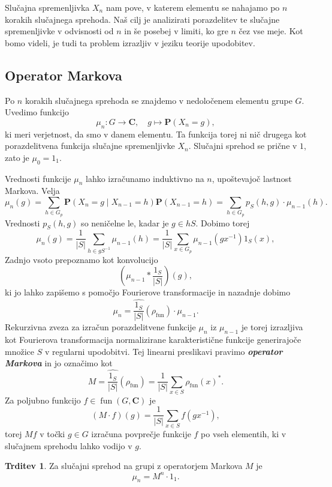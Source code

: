 \documentclass[11pt]{book}
\def\CC{\mathbf{C}}
\def\PP{\mathbf{P}}
\DeclareMathOperator\fun{fun}
\def\definicija{\color{rdeca}\bf\em}
\theoremstyle{definition}
\theoremstyle{zgled}
\theoremstyle{odprtproblem}
\theoremstyle{domacanaloga}
\theoremstyle{izrek}
\newtheorem*{trditev}{Trditev}
\begin{document}
Slučajna spremenljivka $X_n$ nam pove, v katerem elementu se nahajamo po $n$ korakih slučajnega sprehoda. Naš cilj je analizirati porazdelitev te slučajne spremenljivke v odvisnosti od $n$ in še posebej v limiti, ko gre $n$ čez vse meje. Kot bomo videli, je tudi ta problem izrazljiv v jeziku teorije upodobitev.

\subsection{Operator Markova}

Po $n$ korakih slučajnega sprehoda se znajdemo v nedoločenem elementu grupe $G$. Uvedimo funkcijo
\[
    \mu_n \colon G \to \CC, \quad
    g \mapsto \PP(X_n = g),
\]
ki meri verjetnost, da smo v danem elementu. Ta funkcija torej ni nič drugega kot porazdelitvena funkcija slučajne spremenljivke $X_n$. Slučajni sprehod se prične v $1$, zato je $\mu_0 = 1_1$.

Vrednosti funkcije $\mu_n$ lahko izračunamo induktivno na $n$, upoštevajoč lastnost Markova. Velja
\[
    \mu_n(g) 
    = \sum_{h \in G_p} \PP(X_n = g \mid X_{n-1} = h) \PP(X_{n-1} = h)
    = \sum_{h \in G_p} p_{S}(h,g) \cdot \mu_{n-1}(h).
\]
Vrednosti $p_{S}(h,g)$ so neničelne le, kadar je $g \in h S$. Dobimo torej
\[
    \mu_n(g)
    = \frac{1}{|S|} \sum_{h \in g S^{-1}} \mu_{n-1}(h)
    = \frac{1}{|S|} \sum_{x \in G_p} \mu_{n-1}(gx^{-1}) 1_{S}(x),
\]
Zadnjo vsoto prepoznamo kot konvolucijo
\[
    \left( \mu_{n-1} * \frac{1_{S}}{|S|} \right) (g),
\]
ki jo lahko zapišemo s pomočjo Fourierove transformacije in nazadnje dobimo
\[
    \mu_n = \widehat{\frac{1_{S}}{|S|} }(\rho_{\fun}) \cdot \mu_{n-1}.
\]
Rekurzivna zveza za izračun porazdelitvene funkcije $\mu_n$ iz $\mu_{n-1}$ je torej izrazljiva kot Fourierova transformacija normalizirane karakteristične funkcije generirajoče množice $S$ v regularni upodobitvi. Tej linearni preslikavi pravimo {\definicija operator Markova} in jo označimo kot
\[
    M = \widehat{\frac{1_{S}}{|S|} }(\rho_{\fun}) = \frac{1}{|S|} \sum_{x \in S} \rho_{\fun}(x)^*.
\]
Za poljubno funkcijo $f \in \fun(G,\CC)$ je 
\[
    (M \cdot f)(g) = \frac{1}{|S|} \sum_{x \in S} f(g x^{-1}),
\]
torej $Mf$ v točki $g \in G$ izračuna povprečje funkcije $f$ po vseh elementih, ki v slučajnem sprehodu lahko vodijo v $g$.

\begin{trditev}
Za slučajni sprehod na grupi z operatorjem Markova $M$ je
\[
    \mu_n = M^n \cdot 1_1.
\]
\end{trditev}
\end{document}
